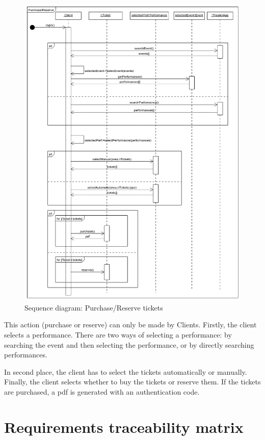 \documentclass{article}
\begin{document}
\begin{figure}[ht]
    \centering
    \includegraphics[width=380pt]{../sequence_buy/buy}
    \caption{Sequence diagram: Purchase/Reserve tickets}
\end{figure}

This action (purchase or reserve) can only be made by Clients.
Firstly, the client selects a performance. There are two ways of selecting a performance: by searching the event and then selecting the performance, or by directly searching performances.

In second place, the client has to select the tickets automatically or manually. 
Finally, the client selects whether to buy the tickets or reserve them. If the tickets are purchased, a pdf is generated with an authentication code.

\newpage

\section{Requirements traceability matrix}
\end{document}
